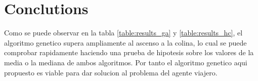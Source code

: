 \documentclass[twocolumn]{IEEEtran}
\begin{document}
\section{Conclutions}

Como se puede observar en la tabla \ref{table:results_ga} y \ref{table:results_hc}, el algoritmo
genetico supera ampliamente al ascenso a la colina, lo cual se puede comprobar rapidamente 
haciendo una prueba de hipotesis sobre los valores de la media o la mediana de ambos algoritmos.
Por tanto el algoritmo genetico aqui propuesto es viable para dar solucion al problema del
agente viajero.

    
\end{document}
